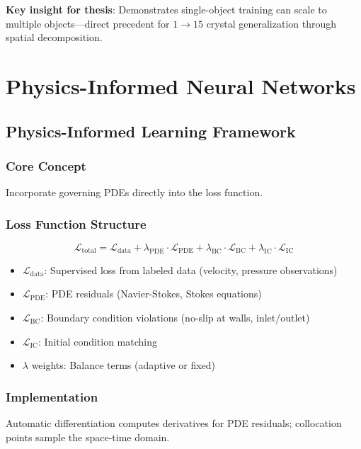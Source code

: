 \textbf{Key insight for thesis}: Demonstrates single-object training can scale to multiple objects---direct precedent for $1 \rightarrow 15$ crystal generalization through spatial decomposition.

\chapter{Physics-Informed Neural Networks}

\section{Physics-Informed Learning Framework}

\subsection{Core Concept}
Incorporate governing PDEs directly into the loss function.

\subsection{Loss Function Structure}
\begin{equation}
\mathcal{L}_{\text{total}} = \mathcal{L}_{\text{data}} + \lambda_{\text{PDE}} \cdot \mathcal{L}_{\text{PDE}} + \lambda_{\text{BC}} \cdot \mathcal{L}_{\text{BC}} + \lambda_{\text{IC}} \cdot \mathcal{L}_{\text{IC}}
\end{equation}

\begin{itemize}
    \item $\mathcal{L}_{\text{data}}$: Supervised loss from labeled data (velocity, pressure observations)
    \item $\mathcal{L}_{\text{PDE}}$: PDE residuals (Navier-Stokes, Stokes equations)
    \item $\mathcal{L}_{\text{BC}}$: Boundary condition violations (no-slip at walls, inlet/outlet)
    \item $\mathcal{L}_{\text{IC}}$: Initial condition matching
    \item $\lambda$ weights: Balance terms (adaptive or fixed)
\end{itemize}

\subsection{Implementation}
Automatic differentiation computes derivatives for PDE residuals; collocation points sample the space-time domain.


